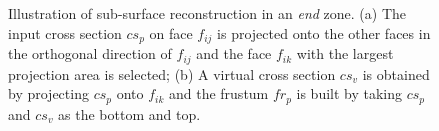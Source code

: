 \begin{figure} [htbp]
  \centering
  \caption{Illustration of sub-surface reconstruction in an \textit{end} zone.
  (a) The input cross section $cs_p$ on face $f_{ij}$ is projected onto the other faces in the orthogonal direction of $f_{ij}$ and the face $f_{ik}$ with the largest projection area is selected;
  (b) A virtual cross section $cs_v$ is obtained by projecting $cs_p$ onto $f_{ik}$ and the frustum $fr_p$ is built by taking $cs_p$ and $cs_v$ as the bottom and top. }
  \label{fig:fruend}
\end{figure}

